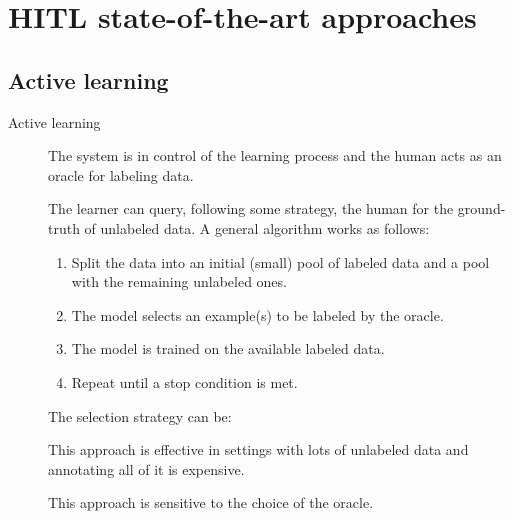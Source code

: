 \section{HITL state-of-the-art approaches}


\subsection{Active learning}

\begin{description}
    \item[Active learning] 
        The system is in control of the learning process and the human acts as an oracle for labeling data.

        The learner can query, following some strategy, the human for the ground-truth of unlabeled data. A general algorithm works as follows:
        \begin{enumerate}
            \item Split the data into an initial (small) pool of labeled data and a pool with the remaining unlabeled ones.
            \item The model selects an example(s) to be labeled by the oracle.
            \item The model is trained on the available labeled data.
            \item Repeat until a stop condition is met.
        \end{enumerate}

        The selection strategy can be:

        \begin{remark}
            This approach is effective in settings with lots of unlabeled data and annotating all of it is expensive.
        \end{remark}

        \begin{remark}
            This approach is sensitive to the choice of the oracle.
        \end{remark}
\end{description}


